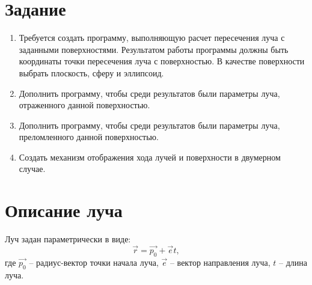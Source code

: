 
\setcounter{page}{2}



\section*{Задание}
{
	\begin{enumerate}
	    \item Требуется создать программу, выполняющую расчет пересечения луча с заданными поверхностями. Результатом работы программы должны быть координаты точки пересечения луча с поверхностью. В качестве поверхности выбрать плоскость, сферу и эллипсоид.
	    
        \item Дополнить программу, чтобы среди результатов были параметры луча, отраженного данной поверхностью.
        
        \item Дополнить программу, чтобы среди результатов были параметры луча, преломленного данной поверхностью.
        
        \item Создать механизм отображения хода лучей и поверхности в двумерном случае.
	\end{enumerate}
}
\newpage

\titleformat{\section}{\large\bfseries}{\thesection}{0.5em}{}
\titlespacing*{\section}{\parindent}{1ex}{1em}

\section{Описание луча}
{
	Луч задан параметрически в виде:
	\begin{equation}\label{ray_eq}
	\vec{r} = \vec{p_0} + \vec{e} t,
	\end{equation}
	где $\vec{p_0}$ -- радиус-вектор точки начала луча, $\vec{e}$ -- вектор направления луча, $t$ -- длина луча.
}

